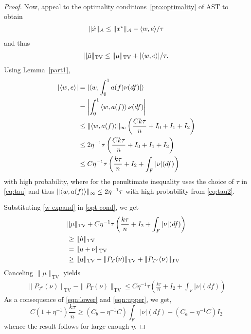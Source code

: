 \begin{proof}
Now, appeal to  the optimality conditions~\eqref{pro:optimality} of AST to obtain
\[
\lVert\hat{x}\rVert_{\mathcal{A}} \leq \lVert x^\star\rVert_{\mathcal{A}} - \langle w, e \rangle/\tau
\]
and thus
\begin{equation}
\label{opt-cond}
\lVert\hat{\mu}\rVert_{\mathrm{TV}} \leq \lVert\mu\rVert_{\mathrm{TV}} + |\langle w, e \rangle|/\tau.
\end{equation}
Using Lemma~\ref{part1},
\begin{align}
\nonumber |\langle w, e \rangle| & = |\langle w, \int_0^1 a(f) \nu(df)  |\rangle\\
& = \left|\int_0^1  \left\langle w,  a(f)  \right\rangle \nu(df)\right|\\
\nonumber & \leq \lVert\left\langle w,  a(f)  \right\rangle\rVert_\infty\left(\frac{C k \tau}{n} + I_0 + I_1 + I_2\right)\\
\label{w-expand}& \leq 2\eta^{-1} \tau \left(\frac{C k \tau}{n} + I_0 + I_1 + I_2\right)\nonumber \\
 & \leq C \eta^{-1} \tau \left(\frac{k\tau}{n} + I_2 + \int_F |\nu|(df) \right)
\end{align}
with high probability, where for the penultimate inequality uses the choice
of $\tau$ in \eqref{eq:tau} and thus $\lVert\left\langle w, a(f) \right\rangle\rVert_\infty \leq 2\eta^{-1}
\tau$ with high probability from \eqref{eq:tau2}.

Substituting \eqref{w-expand} in \eqref{opt-cond}, we get
\begin{align*}
& \lVert\mu\rVert_{\mathrm{TV}} + C \eta^{-1} \tau \left(\frac{k\tau}{n} + I_2 + \int_F |\nu|(df) \right)\\
& \geq \lVert\hat{\mu}\rVert_{\mathrm{TV}}\\
& = \lVert\mu + \nu\rVert_{\mathrm{TV}}\\
& \geq \lVert\mu\rVert_{\mathrm{TV}} - \lVert{P_T(\nu)}\rVert_{\mathrm{TV}} + \lVert{P_{T^c}(\nu)}\rVert_{\mathrm{TV}}\end{align*}
Canceling $\|\mu\|_{\mathrm{TV}}$ yields 
\begin{align}\label{eqn:upper}
\|P_{T^c}(\nu)\|_{\mathrm{TV}} - \|P_T(\nu)\|_{\mathrm{TV}} \leq C\eta^{-1}\tau \left(\frac{k \tau}{n} + I_2 + \int_F |\nu|(df)\right)
\end{align}
As a consequence of \eqref{eqn:lower} and \eqref{eqn:upper}, we get,
\[
  C(1+\eta^{-1}) \frac{k \tau}{n} \geq  ( C_b - \eta^{-1} C)  \int_F{|\nu|(df)} + ( C_a - \eta^{-1} C)I_2
\]
whence the result follows for large enough $\eta.$
\end{proof}

